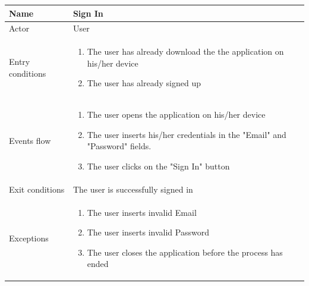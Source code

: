 \documentclass{article}
\begin{document}
\begin{table}[H]
    \begin{tabular}{|l|l|}
    \hline
    Name &\begin{minipage}[t]{0.7\textwidth} Sign In \end{minipage} \\ \hline  
     Actor & \begin{minipage}[t]{0.7\textwidth} User \end{minipage} \\ \hline 
     Entry conditions & \begin{minipage}[t]{0.7\textwidth} \begin{enumerate}
        \item The user has already download the the application on his/her
        device
        \item The user has already signed up
    \end{enumerate}
    \end{minipage} \\ \hline 
     Events flow & \begin{minipage}[t]{0.7\textwidth}
    \begin{enumerate}
        \item The user opens the application on his/her device
        \item The user inserts his/her credentials in the "Email" and "Password"
        fields.
        \item The user clicks on the "Sign In" button
    \end{enumerate}
    \end{minipage} \\ \hline
     Exit conditions & \begin{minipage}[t]{0.7\textwidth} The user is
     successfully signed in \end{minipage} \\ \hline
     Exceptions & \begin{minipage}[t]{0.7\textwidth}
    \begin{enumerate}
        \item The user inserts invalid Email
        \item The user inserts invalid Password   
        \item The user closes the application before the process has ended 
    \end{enumerate}
    \end{minipage} \\ \hline
    \end{tabular}
\end{table}
\end{document}
